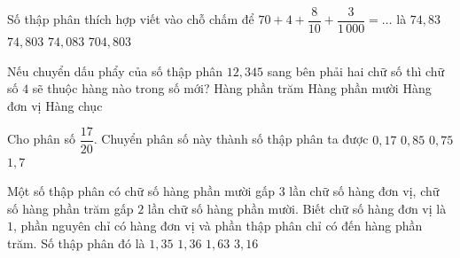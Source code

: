 \begin{ex} %
Số thập phân thích hợp viết vào chỗ chấm để $70 + 4 + \dfrac{8}{10} + \dfrac{3}{1\,000} = \dots$ là
\choice
{$74{,}83$}
{\True $74{,}803$}
{$74{,}083$}
{$704{,}803$}
\end{ex}

\begin{ex} %
Nếu chuyển dấu phẩy của số thập phân $12{,}345$ sang bên phải hai chữ số thì chữ số $4$ sẽ thuộc hàng nào trong số mới?
\choice
{Hàng phần trăm}
{Hàng phần mười}
{\True Hàng đơn vị}
{Hàng chục}
\end{ex}

\begin{ex} %
Cho phân số $\dfrac{17}{20}$. Chuyển phân số này thành số thập phân ta được
\choice
{$0{,}17$}
{\True $0{,}85$}
{$0{,}75$}
{$1{,}7$}
\end{ex}

\begin{ex} %
Một số thập phân có chữ số hàng phần mười gấp $3$ lần chữ số hàng đơn vị, chữ số hàng phần trăm gấp $2$ lần chữ số hàng phần mười. Biết chữ số hàng đơn vị là $1$, phần nguyên chỉ có hàng đơn vị và phần thập phân chỉ có đến hàng phần trăm. Số thập phân đó là
\choice
{$1{,}35$}
{\True $1{,}36$}
{$1{,}63$}
{$3{,}16$}
\end{ex}

